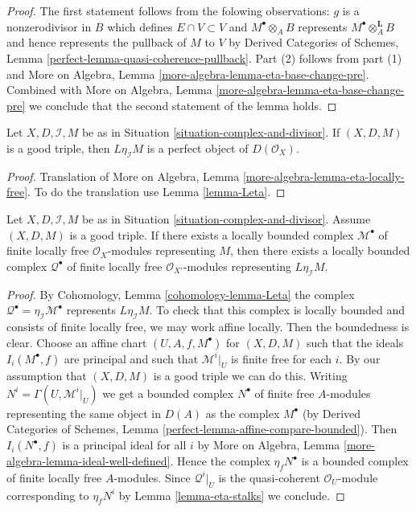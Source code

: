 \begin{proof}
The first statement follows from the folowing observations:
$g$ is a nonzerodivisor in $B$ which defines $E \cap V \subset V$
and $M^\bullet \otimes_A B$ represents $M^\bullet \otimes_A^\mathbf{L} B$
and hence represents the pullback of $M$ to $V$ by
Derived Categories of Schemes, Lemma
\ref{perfect-lemma-quasi-coherence-pullback}.
Part (2) follows from part (1) and
More on Algebra, Lemma \ref{more-algebra-lemma-eta-base-change-pre}.
Combined with
More on Algebra, Lemma \ref{more-algebra-lemma-eta-base-change-pre}
we conclude that the second statement of the lemma holds.
\end{proof}

\begin{lemma}
\label{lemma-good-triple}
Let $X, D, \mathcal{I}, M$ be as in
Situation \ref{situation-complex-and-divisor}.
If $(X, D, M)$ is a good triple, then
$L\eta_\mathcal{I}M$ is a perfect object
of $D(\mathcal{O}_X)$.
\end{lemma}

\begin{proof}
Translation of
More on Algebra, Lemma \ref{more-algebra-lemma-eta-locally-free}.
To do the translation use Lemma \ref{lemma-Leta}.
\end{proof}

\begin{lemma}
\label{lemma-good-triple-bdd-loc-free}
Let $X, D, \mathcal{I}, M$ be as in
Situation \ref{situation-complex-and-divisor}.
Assume $(X, D, M)$ is a good triple.
If there exists a locally bounded complex $\mathcal{M}^\bullet$
of finite locally free $\mathcal{O}_X$-modules representing $M$,
then there exists a locally bounded complex $\mathcal{Q}^\bullet$
of finite locally free $\mathcal{O}_{X'}$-modules representing
$L\eta_\mathcal{I}M$.
\end{lemma}

\begin{proof}
By Cohomology, Lemma \ref{cohomology-lemma-Leta}
the complex $\mathcal{Q}^\bullet = \eta_\mathcal{I}\mathcal{M}^\bullet$
represents $L\eta_\mathcal{I}M$. To check that this complex
is locally bounded and consists of finite locally free, we may work
affine locally. Then the boundedness is clear.
Choose an affine chart $(U, A, f, M^\bullet)$ for $(X, D, M)$
such that the ideals $I_i(M^\bullet, f)$ are principal and such that
$\mathcal{M}^i|_U$ is finite free for each $i$. By our assumption
that $(X, D, M)$ is a good triple we can do this. Writing
$N^i = \Gamma(U, \mathcal{M}^i|_U)$ we get a bounded
complex $N^\bullet$ of finite free $A$-modules representing the
same object in $D(A)$ as the complex $M^\bullet$ (by
Derived Categories of Schemes, Lemma
\ref{perfect-lemma-affine-compare-bounded}).
Then $I_i(N^\bullet, f)$ is a principal ideal for all $i$
by More on Algebra, Lemma \ref{more-algebra-lemma-ideal-well-defined}.
Hence the complex $\eta_fN^\bullet$ is a bounded complex
of finite locally free $A$-modules. Since
$\mathcal{Q}^i|_U$ is the quasi-coherent $\mathcal{O}_U$-module
corresponding to $\eta_fN^i$ by Lemma \ref{lemma-eta-stalks} we conclude.
\end{proof}

